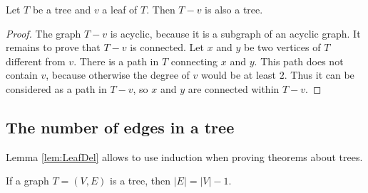 \begin{page}
\setcounter{section}{2}
\setcounter{subsection}{2}
\setcounter{dfn}{6}
\label{portion:226}

\begin{lem}
\label{lem:LeafDel}
Let $T$ be a tree and $v$ a leaf of $T$.
Then $T - v$ is also a tree.
\end{lem}

\end{page}

\begin{page}
\setcounter{section}{2}
\setcounter{subsection}{3}
\setcounter{dfn}{6}
\label{portion:227}

\begin{proof}
The graph $T - v$ is acyclic, because it is a subgraph of an acyclic graph.
It remains to prove that $T - v$ is connected.
Let $x$ and $y$ be two vertices of $T$ different from $v$.
There is a path in $T$ connecting $x$ and $y$.
This path does not contain $v$, because otherwise the degree of $v$ would be at least $2$.
Thus it can be considered as a path in $T - v$, so $x$ and $y$ are connected within $T - v$.
\end{proof}



\end{page}

\begin{page}
\setcounter{section}{2}
\setcounter{subsection}{3}
\setcounter{dfn}{6}
\label{portion:228}

\subsection{The number of edges in a tree}
Lemma \ref{lem:LeafDel} allows to use induction when proving theorems about trees.


\end{page}

\begin{page}
\setcounter{section}{2}
\setcounter{subsection}{3}
\setcounter{dfn}{7}
\label{portion:230}

\begin{thm}
\label{thm:TreeEdges}
If a graph $T = (V, E)$ is a tree, then $|E| = |V| - 1$.
\end{thm}

\end{page}

